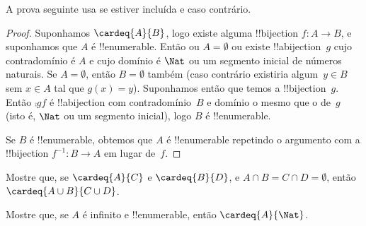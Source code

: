 \documentclass[../../../include/open-logic-section]{subfiles}
\begin{document}
\begin{editorial}
A prova seguinte usa  se  estiver
incluída e  caso contrário.
\end{editorial}

\begin{proof}
Suponhamos $\cardeq{A}{B}$, logo existe alguma !!{bijection} $f \colon A \to B$, e
suponhamos que $A$ é !!{enumerable}.
{
  Então ou $A  = \emptyset$ ou existe !!a{bijection}~$g$ cujo contradomínio é $A$ e
  cujo domínio é $\Nat$ ou um segmento inicial de números naturais. Se $A =
  \emptyset$, então $B = \emptyset$ também (caso contrário existiria algum~$y \in B$
  sem $x \in A$ tal que $g(x) = y$). Suponhamos então que temos a
  !!{bijection}~$g$. Então $\comp{g}{f}$ é !!a{bijection} com contradomínio~$B$ e
  domínio o mesmo que o de~$g$ (isto é, $\Nat$ ou um segmento inicial), logo $B$ é
  !!{enumerable}.}

Se $B$ é !!{enumerable}, obtemos que $A$ é !!{enumerable} repetindo o argumento com
a !!{bijection} $f^{-1}\colon B \to A$ em lugar de~$f$.
\end{proof}

\begin{prob}
Mostre que, se $\cardeq{A}{C}$ e $\cardeq{B}{D}$, e $A \cap B = C \cap D =
\emptyset$, então $\cardeq{A \cup B}{C \cup D}$.
\end{prob}

\begin{prob}
Mostre que, se $A$ é infinito e !!{enumerable}, então $\cardeq{A}{\Nat}$.
\end{prob}
\end{document}

